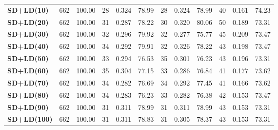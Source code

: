 \documentclass{ieeeaccess}
\begin{document}
\begin{table}[htbp]
\begin{tabular}{|l|c|c|ccc|ccc|ccc|}
\hline
\textbf{SD+LD(10)} & 662 & 100.00 & 28 & \cellcolor[HTML]{fef9e4}0.324 & 78.99 & 28 & 0.324 & 78.99 & 40 & 0.161 & \cellcolor[HTML]{fef9e4}74.23 \\
\textbf{SD+LD(20)} & 662 & 100.00 & 31 & 0.287 & 78.22 & 30 & 0.320 & \cellcolor[HTML]{fef9e4}80.06 & 50 & 0.189 & 73.31 \\
\textbf{SD+LD(30)} & 662 & 100.00 & 32 & 0.296 & \cellcolor[HTML]{fef9e4}79.92 & 32 & 0.277 & 75.77 & 45 & \cellcolor[HTML]{fef9e4}0.209 & 73.47 \\
\textbf{SD+LD(40)} & 662 & 100.00 & 34 & 0.292 & 79.91 & 32 & \cellcolor[HTML]{fef9e4}0.326 & 78.22 & 43 & 0.198 & 73.47 \\
\textbf{SD+LD(50)} & 662 & 100.00 & 33 & 0.294 & 76.53 & 35 & 0.301 & 76.23 & 43 & 0.196 & 73.31 \\
\textbf{SD+LD(60)} & 662 & 100.00 & 35 & 0.304 & 77.15 & 33 & 0.286 & 76.84 & 41 & 0.177 & 73.62 \\
\textbf{SD+LD(70)} & 662 & 100.00 & 34 & 0.282 & 76.69 & 34 & 0.292 & 77.45 & 41 & 0.166 & 73.62 \\
\textbf{SD+LD(80)} & 662 & 100.00 & 34 & 0.283 & 76.23 & 33 & 0.282 & 76.38 & 42 & 0.153 & 73.47 \\
\textbf{SD+LD(90)} & 662 & 100.00 & 31 & 0.311 & 78.99 & 31 & 0.311 & 78.99 & 43 & 0.153 & 73.31 \\
\textbf{SD+LD(100)} & 662 & 100.00 & 31 & 0.311 & 78.83 & 31 & 0.305 & 78.37 & 43 & 0.153 & 73.31 \\
\hline
\end{tabular}
\end{table}
\end{document}
